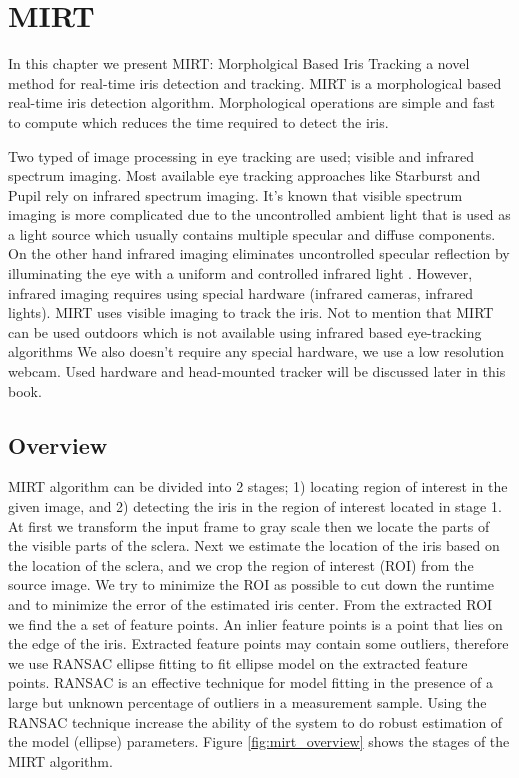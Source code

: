 
\chapter{MIRT} 
In this chapter we present MIRT: Morpholgical Based Iris Tracking a novel method for real-time iris detection and tracking. MIRT is a morphological based real-time iris detection algorithm. Morphological operations are simple and fast to compute which reduces the time required to detect the iris. 

Two typed of image processing in eye tracking are used; visible and infrared spectrum imaging. Most available eye tracking approaches like Starburst \cite{starburst} and Pupil \cite{pupil} rely on infrared spectrum imaging. It's known that visible spectrum imaging is more complicated due to the uncontrolled ambient light that is used as a light source which usually contains multiple specular and diffuse components. On the other hand infrared imaging eliminates uncontrolled specular reflection by illuminating the eye with a uniform and controlled infrared light \cite{starburst}. However, infrared imaging requires using special hardware (infrared cameras, infrared lights). MIRT uses visible imaging to track the iris. Not to mention that MIRT can be used outdoors which is not available using infrared based eye-tracking algorithms We also doesn't require any special hardware, we use a low resolution webcam. Used hardware and head-mounted tracker will be discussed later in this book.\bigskip


\section{Overview}
MIRT algorithm can be divided into 2 stages; 1) locating region of interest in the given image, and 2) detecting the iris in the region of interest located in stage 1. At first we transform the input frame to gray scale then we locate the parts of the visible parts of the sclera. Next we estimate the location of the iris based on the location of the sclera, and we crop the region of interest (ROI) from the source image. We try to minimize the ROI as possible to cut down the runtime and to minimize the error of the estimated iris center. From the extracted ROI we find the a set of feature points. An inlier feature points is a point that lies on the edge of the iris. Extracted feature points may contain some outliers, therefore we use RANSAC ellipse fitting to fit ellipse model on the extracted feature points. RANSAC is an effective technique for model fitting in the presence of a large but unknown percentage of outliers in a measurement sample. Using the RANSAC technique increase the ability of the system to do robust estimation of the model (ellipse) parameters. Figure \ref{fig:mirt_overview} shows the stages of the MIRT algorithm.

